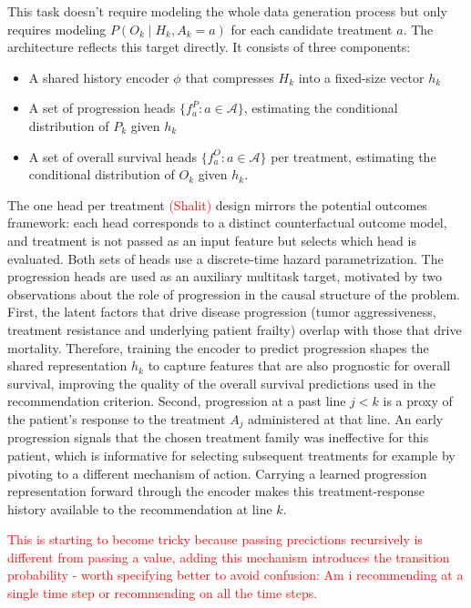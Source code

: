 \documentclass[a4paper,10pt]{article}
\begin{document}
This task doesn't require modeling the whole data generation process but only requires modeling $P(O_k \mid H_k, A_k=a)$ for each candidate treatment $a$.
The architecture reflects this target directly. It consists of three components:
\begin{itemize}
    \item[i.] A shared history encoder $\phi$ that compresses $H_k$ into a fixed-size vector $h_k$
    \item[ii.] A set of progression heads  $\{f^P_a : a \in \mathcal{A}\}$, estimating the conditional distribution of $P_k$ given $h_k$
    \item[iii.] A set of overall survival heads $\{f^O_a : a \in \mathcal{A}\}$ per treatment, estimating the conditional distribution of $O_k$ given $h_k$. 
\end{itemize}
The one head per treatment \textcolor{red}{(Shalit)} design mirrors the potential outcomes framework: each head corresponds to a distinct counterfactual outcome model, and treatment is not passed as an input feature but selects which head is evaluated. Both sets of heads use a discrete-time hazard parametrization. 
The progression heads are used as an auxiliary multitask target, motivated by two observations about the role of progression in the causal structure of the problem. First, the latent factors that drive disease progression (tumor aggressiveness, treatment resistance and underlying patient frailty) overlap with those that drive mortality. Therefore, training the encoder to predict progression shapes the shared representation $h_k$ to capture features that are also prognostic for overall survival, improving the quality of the overall survival predictions used in the recommendation criterion. Second, progression at a past line $j<k$ is a proxy of the patient's response to the treatment $A_j$ administered at that line. An early progression signals that the chosen treatment family was ineffective for this patient, which is informative for selecting subsequent treatments for example by pivoting to a different mechanism of action. Carrying a learned progression representation forward through the encoder makes this treatment-response history available to the recommendation at line $k$.

\noindent \textcolor{red}{\warning This is starting to become tricky because passing precictions recursively is different from passing a value, adding this mechanism introduces the transition probability - worth specifying better to avoid confusion: Am i recommending at a single time step or recommending on all the time steps. \warning}
\end{document}
